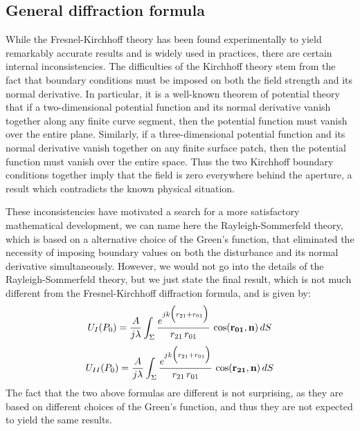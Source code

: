 \documentclass{article}
\begin{document}
\subsection{General diffraction formula} While the Fresnel-Kirchhoff theory has been found experimentally to yield remarkably accurate results and is widely used in practices, there are certain internal inconsistencies. The difficulties of the Kirchhoff theory stem from the fact that boundary conditions must be imposed on both the field strength and its normal derivative. In particular, it is a well-known theorem of potential theory that if a two-dimensional potential function and its normal derivative vanish together along any finite curve segment, then the potential function must vanish over the entire plane. Similarly, if a three-dimensional potential function and its normal derivative vanish together on any finite surface patch, then the potential function must vanish over the entire space. Thus the two Kirchhoff boundary conditions together imply that the field is zero everywhere behind the aperture, a result which contradicts the known physical situation. 

These inconsistencies have motivated a search for a more satisfactory mathematical development, we can name here the Rayleigh-Sommerfeld theory, which is based on a alternative choice of the Green's function, that eliminated the necessity of imposing boundary values on both the disturbance and its normal derivative simultaneously. However, we would not go into the details of the Rayleigh-Sommerfeld theory, but we just state the final result, which is not much different from the Fresnel-Kirchhoff diffraction formula, and is given by:
\begin{equation}
U_I(P_0) = \frac{A}{j\lambda}\int_\Sigma \frac{e^{jk\Bigl(r_{21}+r_{01}\Bigl)}}{r_{21} \, r_{01}}  \, \cos(\mathbf{r_{01}}, \mathbf{n})  \, dS
\end{equation}
\begin{equation}
U_{II}(P_0) = \frac{A}{j\lambda}\int_\Sigma \frac{e^{jk\Bigl(r_{21}+r_{01}\Bigl)}}{r_{21} \, r_{01}}  \, \cos(\mathbf{r_{21}}, \mathbf{n})  \, dS
\end{equation}
The fact that the two above formulas are different is not surprising, as they are based on different choices of the Green's function, and thus they are not expected to yield the same results.
\end{document}
